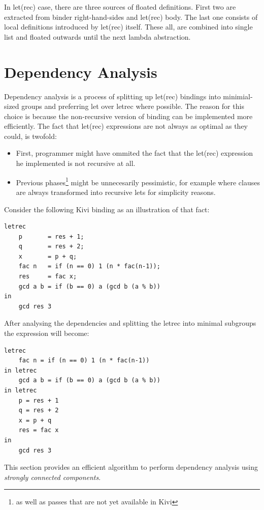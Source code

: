\documentclass[12pt,a4paper]{report}
\begin{document}
In let(rec) case, there are three sources of floated definitions. First two are
extracted from binder right-hand-sides and let(rec) body. The last one consists
of local definitions introduced by let(rec) itself. These all, are combined into
single list and floated outwards until the next lambda abstraction.

\section{Dependency Analysis}
Dependency analysis is a process of splitting up let(rec) bindings
into minimial-sized groups and preferring let over letrec
where possible. The reason for this choice is because the non-recursive version
of binding can be implemented more efficiently. The fact that let(rec)
expressions are not always as optimal as they could, is twofold:
\begin{itemize}
  \item First, programmer might have ommited the fact that the
    let(rec) expression he implemented is not recursive at all.
  \item Previous phases\footnote{as well as passes that are not yet available
    in Kivi} might be unnecesarily pessimistic, for example where
    clauses are always transformed into recursive lets for simplicity
    reasons.
\end{itemize}
Consider the following Kivi binding as an illustration of that fact:

\vspace*{0.2in}
\begin{lstlisting}[style=haskell,label=lst:letrec_dependency_example,caption={Example of
  letrec before dependency analysis.}]
letrec
    p       = res + 1;
    q       = res + 2;
    x       = p + q;
    fac n   = if (n == 0) 1 (n * fac(n-1));
    res     = fac x;
    gcd a b = if (b == 0) a (gcd b (a % b))
in
    gcd res 3
\end{lstlisting}
After analysing the dependencies and splitting the letrec into minimal
subgroups the expression will become:

\vspace*{0.2in}
\begin{lstlisting}[style=haskell,label=lst:letrec_after_anlysis,caption={letrec
  after performing dependency anlysis.}]
letrec
    fac n = if (n == 0) 1 (n * fac(n-1))
in letrec
    gcd a b = if (b == 0) a (gcd b (a % b))
in letrec
    p = res + 1
    q = res + 2
    x = p + q
    res = fac x
in
    gcd res 3
\end{lstlisting}
This section provides an efficient algorithm to perform dependency analysis
using \textit{strongly connected components}.
\end{document}

